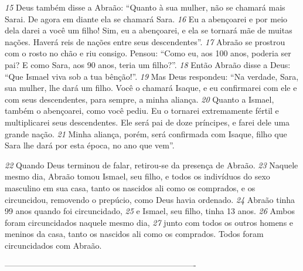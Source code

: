 \bigskip
\textit{\tiny 15}
Deus também disse a Abraão: “Quanto à sua mulher, não se chamará mais Sarai.
De agora em diante ela se chamará Sara. 
\textit{\tiny 16}
Eu a abençoarei e por meio dela darei
a você um filho! Sim, eu a abençoarei, e ela se tornará mãe de muitas nações.
Haverá reis de nações entre seus descendentes”.
\textit{\tiny 17}
Abraão se prostrou com o rosto no chão e riu consigo. Pensou: “Como eu, aos
100 anos, poderia ser pai? E como Sara, aos 90 anos, teria um filho?”. 
\textit{\tiny 18}
Então
Abraão disse a Deus: “Que Ismael viva sob a tua bênção!”.
\textit{\tiny 19}
Mas Deus respondeu: “Na verdade, Sara, sua mulher, lhe dará um filho. Você
o chamará Isaque, e eu confirmarei com ele e com seus descendentes, para
sempre, a minha aliança. 
\textit{\tiny 20}
Quanto a Ismael, também o abençoarei, como você
pediu. Eu o tornarei extremamente fértil e multiplicarei seus descendentes. Ele
será pai de doze príncipes, e farei dele uma grande nação. 
\textit{\tiny 21}
Minha aliança,
porém, será confirmada com Isaque, filho que Sara lhe dará por esta época, no
ano que vem”.

\bigskip 
\textit{\tiny 22}
Quando Deus terminou de falar, retirou-se da presença de
Abraão.
\textit{\tiny 23}
Naquele mesmo dia, Abraão tomou Ismael, seu filho, e todos os indivíduos do
sexo masculino em sua casa, tanto os nascidos ali como os comprados, e os
circuncidou, removendo o prepúcio, como Deus havia ordenado. 
\textit{\tiny 24}
Abraão tinha
99 anos quando foi circuncidado, 
\textit{\tiny 25}
e Ismael, seu filho, tinha 13 anos. 
\textit{\tiny 26}
Ambos
foram circuncidados naquele mesmo dia, 
\textit{\tiny 27}
junto com todos os outros homens e
meninos da casa, tanto os nascidos ali como os comprados. Todos foram
circuncidados com Abraão.

----------------------------------------------------------------------
